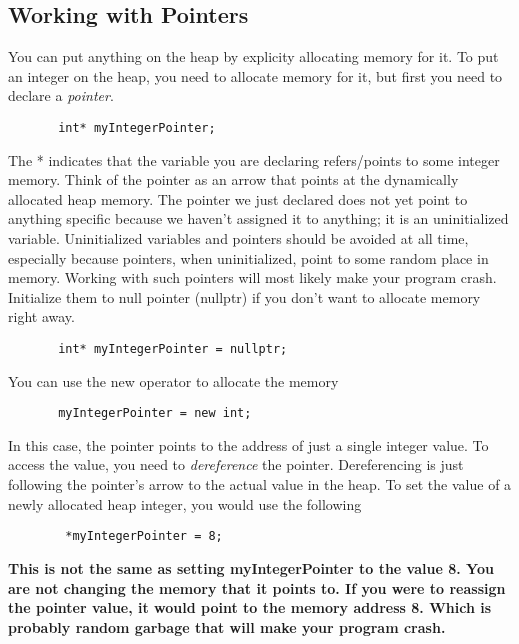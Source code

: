 \documentclass{article}
\begin{document}
\subsection{Working with Pointers}
You can put anything on the heap by explicity allocating memory for it. To put an integer on the heap,
you need to allocate memory for it, but first you need to declare a \textit{pointer}.
\begin{verbatim}
       int* myIntegerPointer;
\end{verbatim}
The * indicates that the variable you are declaring refers/points to some integer memory. Think of
the pointer as an arrow that points at the dynamically allocated heap memory. The pointer we just
declared does not yet point to anything specific because we haven't assigned it to anything; it
is an uninitialized variable. Uninitialized variables and pointers should be avoided at all time,
especially because pointers, when uninitialized, point to some random place in memory. Working
with such pointers will most likely make your program crash. Initialize them to null pointer (nullptr)
if you don't want to allocate memory right away.
\begin{verbatim}
       int* myIntegerPointer = nullptr;
\end{verbatim}
You can use the new operator to allocate the memory
\begin{verbatim}
       myIntegerPointer = new int;
\end{verbatim}
In this case, the pointer points to the address of just a single integer value. To access the value,
you need to \textit{dereference} the pointer. Dereferencing is just following the pointer's arrow
to the actual value in the heap. To set the value of a newly allocated heap integer, you
would use the following
\begin{verbatim}
        *myIntegerPointer = 8;
\end{verbatim}
\textbf{This is not the same as setting myIntegerPointer to the value 8. You are not changing the memory
	that it points to. If you were to reassign the pointer value, it would point to the memory address 8.
	Which is probably random garbage that will make your program crash.}
\end{document}
